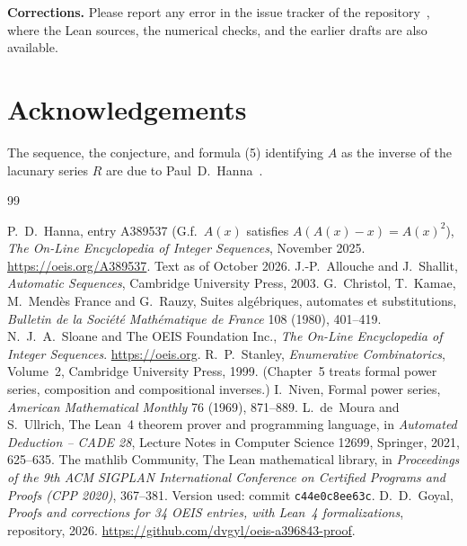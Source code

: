 \documentclass[11pt,a4paper]{article}
\theoremstyle{definition}
\theoremstyle{remark}
\newcommand{\para}[1]{\par\medskip\noindent\textbf{#1}\enspace}
\begin{document}
\para{Corrections.} Please report any error in the issue tracker of the repository~\cite{repo}, where the Lean
sources, the numerical checks, and the earlier drafts are also available.

\section*{Acknowledgements}
The sequence, the conjecture, and formula (5) identifying $A$ as the inverse of the lacunary series $R$ are due to
Paul~D.~Hanna~\cite{oeis}.

\begin{thebibliography}{99}\small
\raggedright
{} P.~D.~Hanna, entry A389537 (G.f.\ $A(x)$ satisfies $A(A(x)-x)=A(x)^2$), \emph{The On-Line Encyclopedia of Integer Sequences}, November 2025. \url{https://oeis.org/A389537}. Text as of October 2026.
 J.-P.~Allouche and J.~Shallit, \emph{Automatic Sequences}, Cambridge University Press, 2003.
 G.~Christol, T.~Kamae, M.~Mend\`es France and G.~Rauzy, Suites alg\'ebriques, automates et substitutions, \emph{Bulletin de la Soci\'et\'e Math\'ematique de France} 108 (1980), 401--419.
 N.~J.~A.~Sloane and The OEIS Foundation Inc., \emph{The On-Line Encyclopedia of Integer Sequences}. \url{https://oeis.org}.
 R.~P.~Stanley, \emph{Enumerative Combinatorics}, Volume~2, Cambridge University Press, 1999. (Chapter~5 treats formal power series, composition and compositional inverses.)
 I.~Niven, Formal power series, \emph{American Mathematical Monthly} 76 (1969), 871--889.
 L.~de~Moura and S.~Ullrich, The Lean~4 theorem prover and programming language, in \emph{Automated Deduction -- CADE 28}, Lecture Notes in Computer Science 12699, Springer, 2021, 625--635.
 The mathlib Community, The Lean mathematical library, in \emph{Proceedings of the 9th ACM SIGPLAN International Conference on Certified Programs and Proofs (CPP 2020)}, 367--381. Version used: commit \texttt{c44e0c8ee63c}.
 D.~D.~Goyal, \emph{Proofs and corrections for 34 OEIS entries, with Lean~4 formalizations}, repository, 2026. \url{https://github.com/dvgyl/oeis-a396843-proof}.
\end{thebibliography}
\end{document}
